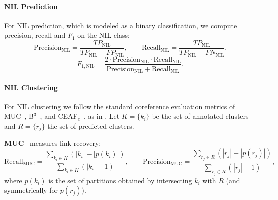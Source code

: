 \paragraph{NIL Prediction}
For NIL prediction, which is modeled as a binary classification, we compute precision, recall and $F_1$ on the NIL class:
\begin{equation}
\text{Precision}_{\text{NIL}} = 
\frac{TP_{\text{NIL}}}{TP_{\text{NIL}} + FP_{\text{NIL}}}, \qquad
\text{Recall}_{\text{NIL}} =
\frac{TP_{\text{NIL}}}{TP_{\text{NIL}} + FN_{\text{NIL}}}.
\end{equation}
\begin{equation}
F_{1,\text{NIL}} =
\frac{2 \cdot \text{Precision}_{\text{NIL}} \cdot \text{Recall}_{\text{NIL}}}
{\text{Precision}_{\text{NIL}} + \text{Recall}_{\text{NIL}}}.
\end{equation}


\paragraph{NIL Clustering}
For NIL clustering we follow the standard coreference evaluation metrics
of MUC~\cite{vilain1995}, B$^3$~\cite{bagga-baldwin-1998}, 
and CEAF$_e$~\cite{luo2005coreference}, as in \textcite{streaming_crossdoc_coreference}.  
Let $K=\{k_i\}$ be the set of annotated clusters and $R=\{r_j\}$ the set of predicted clusters. 

\medskip
\noindent\textbf{MUC}~\cite{vilain1995} measures link recovery:
\begin{equation}
\text{Recall}_{\text{MUC}} =
\frac{\sum_{k_i \in K} \left( |k_i| - |p(k_i)| \right)}
     {\sum_{k_i \in K} \left( |k_i| - 1 \right)}, \qquad
\text{Precision}_{\text{MUC}} =
\frac{\sum_{r_j \in R} \left( |r_j| - |p(r_j)| \right)}
     {\sum_{r_j \in R} \left( |r_j| - 1 \right)} ,
\end{equation}
where $p(k_i)$ is the set of partitions obtained by intersecting $k_i$ with $R$ (and symmetrically for $p(r_j)$).

